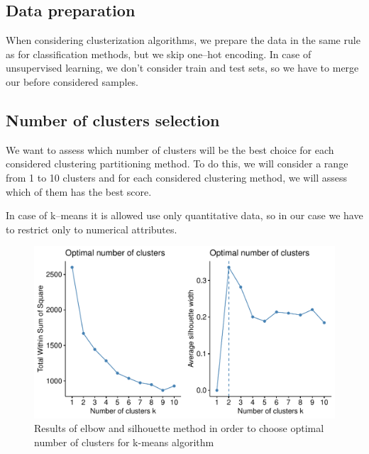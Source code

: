\documentclass[11pt,a4paper]{article}\usepackage[]{graphicx}\usepackage[]{xcolor}
\makeatletter
\def\maxwidth{ %
  \ifdim\Gin@nat@width>\linewidth
    \linewidth
  \else
    \Gin@nat@width
  \fi
}
\newenvironment{knitrout}{}{} %
\makeatother
\begin{document}
	\subsection{Data preparation}
	
	When considering clusterization algorithms, we prepare the data in the same rule as for classification methods, but we skip one--hot encoding. In case of unsupervised learning, we don't consider train and test sets, so we have to merge our before considered samples. 
	

	
	\subsection{Number of clusters selection}\label{sec:optimal_cluster_number}
	We want to assess which number of clusters will be the best choice for each considered clustering partitioning method. To do this, we will consider a range from 1 to 10 clusters and for each considered clustering method, we will assess which of them has the best score.
	
	In case of k--means it is allowed use only quantitative data, so in our case we have to restrict only to numerical attributes.
	
\begin{knitrout}
\color{fgcolor}\begin{figure}
\includegraphics[width=\maxwidth]{figure/kmeans_number_of_clusters-1} \caption[Results of elbow and silhouette method in order to choose optimal number of clusters for k-means algorithm]{Results of elbow and silhouette method in order to choose optimal number of clusters for k-means algorithm}\label{fig:kmeans_number_of_clusters}
\end{figure}

\end{knitrout}
	
\end{document}
